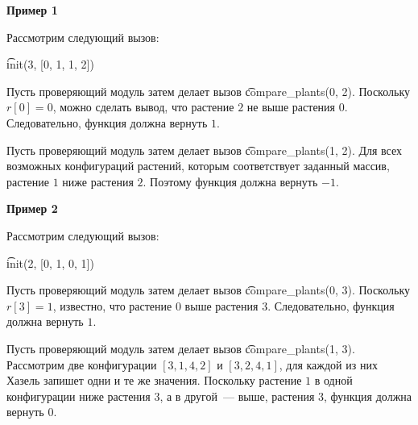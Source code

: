 \textbf{Пример 1}

Рассмотрим следующий вызов:

\t{init(3, [0, 1, 1, 2])}

Пусть проверяющий модуль затем делает вызов \t{compare\_plants(0, 2)}. Поскольку $r[0] = 0$, можно сделать вывод, что растение $2$ не выше растения $0$. Следовательно, функция должна вернуть $1$.

Пусть проверяющий модуль затем делает вызов \t{compare\_plants(1, 2)}. Для всех возможных конфигураций растений, которым соответствует заданный массив, растение $1$ ниже растения $2$.  Поэтому функция должна вернуть $-1$.

\textbf{Пример 2}

Рассмотрим следующий вызов:

\t{init(2, [0, 1, 0, 1])}

Пусть проверяющий модуль затем делает вызов \t{compare\_plants(0, 3)}. Поскольку $r[3] = 1$, известно, что растение $0$ выше растения $3$. Следовательно, функция должна вернуть $1$.

Пусть проверяющий модуль затем делает вызов \t{compare\_plants(1, 3)}. Рассмотрим две конфигурации $[3,1,4,2]$ и $[3,2,4,1]$, для каждой из них Хазель запишет одни и те же значения. Поскольку растение $1$ в одной конфигурации ниже растения $3$, а в другой~--- выше, растения $3$, функция должна вернуть $0$.

